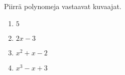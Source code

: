 %
%
%
%
%
%
%
%
%

\Harjoitustehtavat

\begin{tehtava}
    Piirrä polynomeja vastaavat kuvaajat.
    \begin{enumerate}
        \item $5$
        \item $2x-3$
        \item $x^2+x-2$
        \item $x^3-x+3$
    \end{enumerate}   
    \begin{vastaus}
    	\item \begin{kuvaajapohja}{0.4}{-4}{4}{-1}{7}
			  \end{kuvaajapohja}
    	\item \begin{kuvaajapohja}{0.4}{-4}{4}{-5}{3}
			  \end{kuvaajapohja}
		\item \begin{kuvaajapohja}{0.4}{-4}{4}{-3}{5}
			  \end{kuvaajapohja}
		\item \begin{kuvaajapohja}{0.4}{-4}{4}{-3}{5}
			  \end{kuvaajapohja}
    \end{vastaus}
\end{tehtava}

